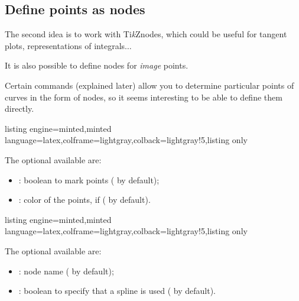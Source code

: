 \documentclass[11pt,a4paper]{ltxdoc}
\providecommand\tikzlogo{Ti\textit{k}Z}
\let\TikZ\tikzlogo
\begin{document}
\pagebreak

\subsection{Define points as nodes}\label{defpts}

The second idea is to work with \TikZ nodes, which could be useful for tangent plots, representations of integrals$\ldots$

\smallskip

It is also possible to define nodes for \textit{image} points.

\smallskip

Certain commands (explained later) allow you to determine particular points of curves in the form of nodes, so it seems interesting to be able to define them directly.

\begin{tcblisting}{listing engine=minted,minted language=latex,colframe=lightgray,colback=lightgray!5,listing only}
\end{tcblisting}

The optional \MontreCode{[keys]} available are:

\smallskip

\begin{itemize}
	\item {}: boolean to mark points ( by default);
	\item {}: color of the points, if  ( by default).
\end{itemize}

\begin{tcblisting}{listing engine=minted,minted language=latex,colframe=lightgray,colback=lightgray!5,listing only}
\end{tcblisting}

The optional \MontreCode{[keys]} available are:

\smallskip

\begin{itemize}
	\item {}: node name ( by default);
	\item {}: boolean to specify that a spline is used ( by default).
\end{itemize}
\end{document}
